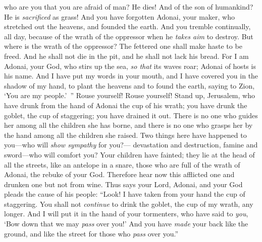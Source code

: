 \begin{biblechapter}
who are you that you are afraid of man? He dies! 
And of the son of humankind? He is \textit{sacrificed} as grass!
\verse And you have forgotten Adonai, your maker, 
who stretched out the heavens, 
and founded the earth. 
And you tremble continually, all day, 
because of the wrath of the oppressor 
when he \textit{takes aim} to destroy. 
But where is the wrath of the oppressor?
\verse The fettered one shall make haste to be freed. 
And he shall not die in the pit, 
and he shall not lack his bread.
\verse For I am Adonai, your God, 
who stirs up the sea, \textit{so that} its waves roar; 
Adonai of hosts is his name.
\verse And I have put my words in your mouth, 
and I have covered you in the shadow of my hand, 
to plant the heavens 
and to found the earth, 
saying to Zion, ‘You are my people.’ ”
\verse Rouse yourself! Rouse yourself! 
Stand up, Jerusalem, who have drunk from the hand of Adonai the cup of his wrath; 
you have drunk the goblet, the cup of staggering; 
you have drained it out.
\verse There is no one who guides her among all the children she has borne, 
and there is no one who grasps her by the hand among all the children she raised.
\verse Two things here have happened to you—who will \textit{show sympathy} for you?— 
devastation and destruction, famine and sword—who will comfort you?
\verse Your children have fainted; 
they lie at the head of all the streets, like an antelope in a snare, 
those who are full of the wrath of Adonai, 
the rebuke of your God.
\verse Therefore hear now this afflicted one 
and drunken one but not from wine.
\verse Thus says your Lord, Adonai, 
and your God pleads the cause of his people: 
“Look! I have taken from your hand the cup of staggering. 
You shall not \textit{continue} to drink the goblet, the cup of my wrath, any longer.
\verse And I will put it in the hand of your tormenters, 
who have said to \textit{you}, ‘Bow down that we may \textit{pass} over you!’ 
And you have \textit{made} your back like the ground, 
and like the street for those who \textit{pass} over you.”
\end{biblechapter}

